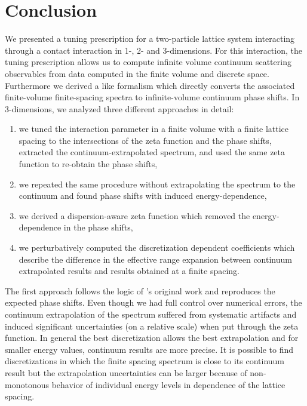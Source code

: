 \section{Conclusion}\label{sec:conclusion}

We presented a tuning prescription for a two-particle lattice system interacting through a contact interaction in 1-, 2- and 3-dimensions.
For this interaction, the tuning prescription allows us to compute infinite volume continuum scattering observables %
from data computed in the finite volume and discrete space.
Furthermore we derived a \Luscher like formalism which directly converts the associated finite-volume finite-spacing spectra to infinite-volume continuum phase shifts.
In 3-dimensions, we analyzed three different approaches in detail:
\begin{enumerate}
	\item we tuned the interaction parameter in a finite volume with a finite lattice spacing to the intersections of the \Luscher zeta function and the phase shifts, extracted the continuum-extrapolated spectrum, and used the same \Luscher zeta function to re-obtain the phase shifts,
	\item we repeated the same procedure without extrapolating the spectrum to the continuum and found phase shifts with induced energy-dependence,
	\item we derived a dispersion-aware zeta function which removed the energy-dependence in the phase shifts,
	\item we perturbatively computed the discretization dependent coefficients which describe the difference in the effective range expansion between continuum extrapolated results and results obtained at a finite spacing.
\end{enumerate}

The first approach follows the logic of \Luscher's original work and reproduces the expected phase shifts.
Even though we had full control over numerical errors, the continuum extrapolation of the spectrum suffered from systematic artifacts and induced significant uncertainties (on a relative scale) when put through the zeta function.
In general the best discretization allows the best extrapolation and for smaller energy values, continuum results are more precise.
It is possible to find discretizations in which the finite spacing spectrum is close to its continuum result but the extrapolation uncertainties can be larger because of non-monotonous behavior of individual energy levels in dependence of the lattice spacing.

